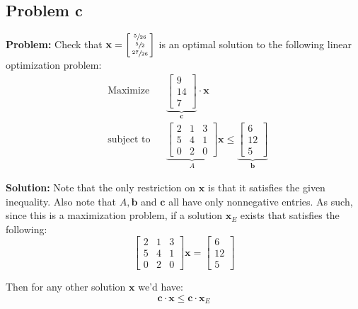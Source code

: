 \documentclass{article}
\newcommand{\icol}[1]{%
  \begin{bsmallmatrix}#1\end{bsmallmatrix}%
}
\renewcommand\vec{\mathbf}
\begin{document}
\subsection*{Problem c}
\noindent\textbf{Problem:} Check that $\vec x=\icol{\sfrac{5}{26}\\\sfrac{5}{2}\\\sfrac{27}{26}}$ is an optimal solution to the following linear optimization problem:
$$\begin{aligned}
    &{\text{Maximize}}
    &&\underbrace{\begin{bmatrix}
        9\\14\\7
    \end{bmatrix}}_{\vec c}\cdot\vec x\\
    &{\text{subject to}}
    &&\underbrace{\begin{bmatrix}
        2&1&3\\5&4&1\\0&2&0
    \end{bmatrix}}_{A}\vec x\le\underbrace{\begin{bmatrix}
        6\\12\\5
    \end{bmatrix}}_{\vec b}%
\end{aligned}$$
\bigskip

\noindent\textbf{Solution:} Note that the only restriction on $\vec x$ is that it satisfies the given inequality. Also note that $A,\vec b$ and $\vec c$ all have only nonnegative entries. As such, since this is a maximization problem, if a solution $\vec x_E$ exists that satisfies the following:
\begin{equation*}
    \begin{bmatrix}
        2&1&3\\5&4&1\\0&2&0
    \end{bmatrix}\vec x=\begin{bmatrix}
        6\\12\\5
    \end{bmatrix}
\end{equation*}

Then for any other solution $\vec x$ we'd have:
\begin{equation*}
    \vec c\cdot \vec x\le \vec c\cdot\vec x_E
\end{equation*}
\end{document}
